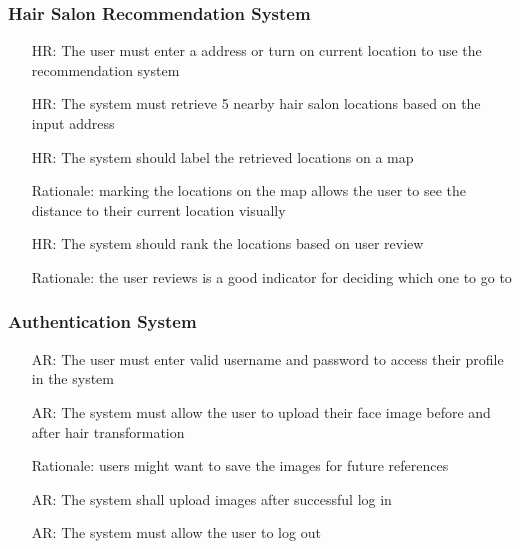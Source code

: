\documentclass[12pt]{article}
\newcounter{reqnum} %
\newcounter{arreqnum} %
\newcounter{hrreqnum} %
\begin{document}
\subsubsection{Hair Salon Recommendation System}
    \begin{itemize}
        \item[HR\refstepcounter{hrreqnum}\thehrreqnum \label{R_Inputs}:] The user must enter a address or turn on current location to use the recommendation system
        \item[HR\refstepcounter{hrreqnum}\thehrreqnum \label{R_Inputs}:] The system must retrieve 5 nearby hair salon locations based on the input address
        \item[HR\refstepcounter{hrreqnum}\thehrreqnum \label{R_Inputs}:] The system should label the retrieved locations on a map
        \item[] Rationale: marking the locations on the map allows the user to see the distance to their current location visually
        \item[HR\refstepcounter{hrreqnum}\thehrreqnum \label{R_Inputs}:] The system should rank the locations based on user review
        \item[] Rationale: the user reviews is a good indicator for deciding which one to go to
    \end{itemize}
    
\subsubsection{Authentication System}
    \begin{itemize}
        \item[AR\refstepcounter{arreqnum}\thearreqnum \label{R_Inputs}:] The user must enter valid username and password to access their profile in the system
        \item[AR\refstepcounter{arreqnum}\thearreqnum \label{R_Inputs}:] The system must allow the user to upload their face image before and after hair transformation
        \item[] Rationale: users might want to save the images for future references
        \item[AR\refstepcounter{arreqnum}\thearreqnum \label{R_Inputs}:] The system shall upload images after successful log in
        \item[AR\refstepcounter{arreqnum}\thearreqnum \label{R_Inputs}:] The system must allow the user to log out
    \end{itemize}
\end{document}
